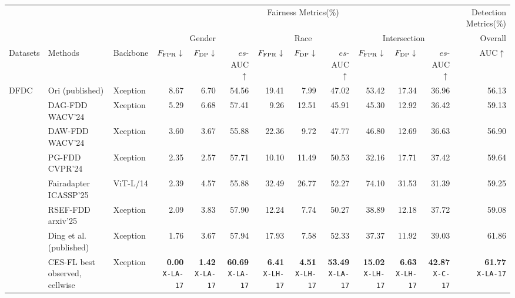 \documentclass[10pt]{article}
\begin{document}
{\fontsize{8}{9.5}\selectfont\setlength{\tabcolsep}{3pt}
\renewcommand{\arraystretch}{1.05}
\begin{tabular*}{\linewidth}{@{\extracolsep{\fill}}lllrrrrrrrrrr}\toprule
 & & & \multicolumn{9}{c}{Fairness Metrics(\%)} & Detection Metrics(\%)\\
 & & & \multicolumn{3}{c}{Gender} & \multicolumn{3}{c}{Race} & \multicolumn{3}{c}{Intersection} & Overall\\
Datasets & Methods & Backbone & $F_{\rm FPR}\downarrow$ & $F_{\rm DP}\downarrow$ & $es$-AUC$\uparrow$ & $F_{\rm FPR}\downarrow$ & $F_{\rm DP}\downarrow$ & $es$-AUC$\uparrow$ & $F_{\rm FPR}\downarrow$ & $F_{\rm DP}\downarrow$ & $es$-AUC$\uparrow$ & AUC$\uparrow$\\\midrule
DFDC & Ori (published) & Xception & 8.67 & 6.70 & 54.56 & 19.41 & 7.99 & 47.02 & 53.42 & 17.34 & 36.96 & 56.13\\
 & DAG-FDD WACV'24 & Xception & 5.29 & 6.68 & 57.41 & 9.26 & 12.51 & 45.91 & 45.30 & 12.92 & 36.42 & 59.13\\
 & DAW-FDD WACV'24 & Xception & 3.60 & 3.67 & 55.88 & 22.36 & 9.72 & 47.77 & 46.80 & 12.69 & 36.63 & 56.90\\
 & PG-FDD CVPR'24 & Xception & 2.35 & 2.57 & 57.71 & 10.10 & 11.49 & 50.53 & 32.16 & 17.71 & 37.42 & 59.64\\
 & Fairadapter ICASSP'25 & ViT-L/14 & 2.39 & 4.57 & 55.88 & 32.49 & 26.77 & 52.27 & 74.10 & 31.53 & 31.39 & 59.25\\
 & RSEF-FDD arxiv'25 & Xception & 2.09 & 3.83 & 57.90 & 12.24 & 7.74 & 50.27 & 38.89 & 12.18 & 37.72 & 59.08\\
 & Ding et al. (published) & Xception & 1.76 & 3.67 & 57.94 & 17.93 & 7.58 & 52.33 & 37.37 & 11.92 & 39.03 & 61.86\\
\rowcolor{blue!8} & CES-FL best observed, cellwise & Xception & \shortstack{\textbf{0.00}\\{\tiny\texttt{X-LA-17}}} & \shortstack{\textbf{1.42}\\{\tiny\texttt{X-LA-17}}} & \shortstack{\textbf{60.69}\\{\tiny\texttt{X-LA-17}}} & \shortstack{\textbf{6.41}\\{\tiny\texttt{X-LH-17}}} & \shortstack{\textbf{4.51}\\{\tiny\texttt{X-LH-17}}} & \shortstack{\textbf{53.49}\\{\tiny\texttt{X-LA-17}}} & \shortstack{\textbf{15.02}\\{\tiny\texttt{X-LH-17}}} & \shortstack{\textbf{6.63}\\{\tiny\texttt{X-LH-17}}} & \shortstack{\textbf{42.87}\\{\tiny\texttt{X-C-17}}} & \shortstack{\textbf{61.77}\\{\tiny\texttt{X-LA-17}}}\\

\end{tabular*}}
\end{document}
